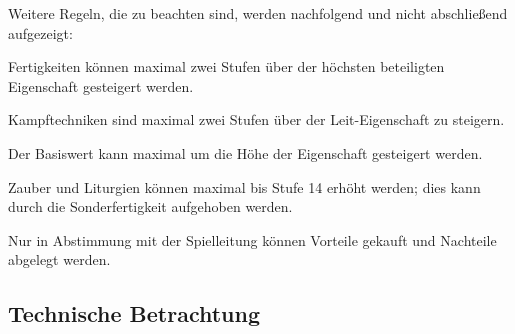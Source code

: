 Weitere Regeln, die zu beachten sind, werden nachfolgend und nicht abschließend aufgezeigt:
\begin{inparaenum}[\bfseries(a)]
    \item Fertigkeiten können maximal zwei Stufen über der höchsten beteiligten Eigenschaft gesteigert werden.
    \item Kampftechniken sind maximal zwei Stufen über der Leit-Eigenschaft zu steigern.
    \item Der Basiswert  kann maximal um die Höhe der Eigenschaft  gesteigert werden.
    \item Zauber und Liturgien können maximal bis Stufe 14 erhöht werden; dies kann durch die Sonderfertigkeit  \bzw {} aufgehoben werden.
    \item Nur in Abstimmung mit der Spielleitung können Vorteile gekauft und Nachteile abgelegt werden.
\end{inparaenum}


\subsection{Technische Betrachtung}\label{subsec:technische-betrachtung}


